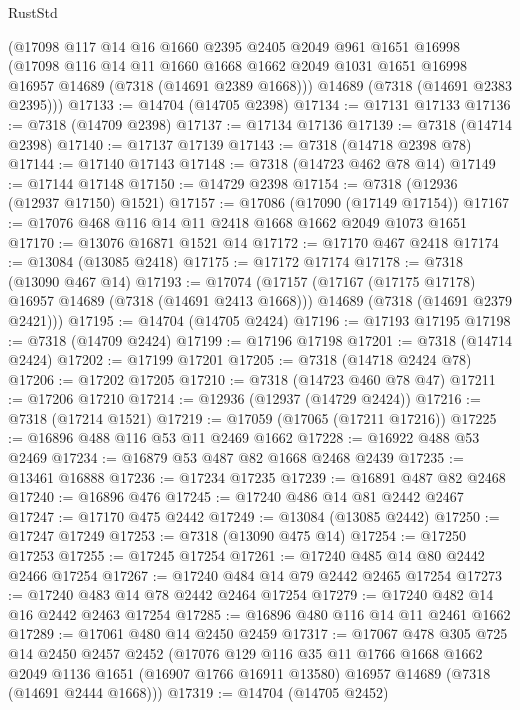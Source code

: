 \begin{lexlean}{RustStd}
\begin{coremodule}
    (@17098
      @117
      @14
      @16
      @1660
      @2395
      @2405
      @2049
      @961
      @1651
      @16998
      (@17098
        @116
        @14
        @11
        @1660
        @1668
        @1662
        @2049
        @1031
        @1651
        @16998
        @16957
        @14689
        (@7318 (@14691 @2389 @1668)))
      @14689
      (@7318 (@14691 @2383 @2395)))
@17133 := @14704 (@14705 @2398)
@17134 := @17131 @17133
@17136 := @7318 (@14709 @2398)
@17137 := @17134 @17136
@17139 := @7318 (@14714 @2398)
@17140 := @17137 @17139
@17143 := @7318 (@14718 @2398 @78)
@17144 := @17140 @17143
@17148 := @7318 (@14723 @462 @78 @14)
@17149 := @17144 @17148
@17150 := @14729 @2398
@17154 := @7318 (@12936 (@12937 @17150) @1521)
@17157 := @17086 (@17090 (@17149 @17154))
@17167 := @17076 @468 @116 @14 @11 @2418 @1668 @1662 @2049 @1073 @1651
@17170 := @13076 @16871 @1521 @14
@17172 := @17170 @467 @2418
@17174 := @13084 (@13085 @2418)
@17175 := @17172 @17174
@17178 := @7318 (@13090 @467 @14)
@17193 := @17074
    (@17157
      (@17167 (@17175 @17178) @16957 @14689 (@7318 (@14691 @2413 @1668)))
      @14689
      (@7318 (@14691 @2379 @2421)))
@17195 := @14704 (@14705 @2424)
@17196 := @17193 @17195
@17198 := @7318 (@14709 @2424)
@17199 := @17196 @17198
@17201 := @7318 (@14714 @2424)
@17202 := @17199 @17201
@17205 := @7318 (@14718 @2424 @78)
@17206 := @17202 @17205
@17210 := @7318 (@14723 @460 @78 @47)
@17211 := @17206 @17210
@17214 := @12936 (@12937 (@14729 @2424))
@17216 := @7318 (@17214 @1521)
@17219 := @17059 (@17065 (@17211 @17216))
@17225 := @16896 @488 @116 @53 @11 @2469 @1662
@17228 := @16922 @488 @53 @2469
@17234 := @16879 @53 @487 @82 @1668 @2468 @2439
@17235 := @13461 @16888
@17236 := @17234 @17235
@17239 := @16891 @487 @82 @2468
@17240 := @16896 @476
@17245 := @17240 @486 @14 @81 @2442 @2467
@17247 := @17170 @475 @2442
@17249 := @13084 (@13085 @2442)
@17250 := @17247 @17249
@17253 := @7318 (@13090 @475 @14)
@17254 := @17250 @17253
@17255 := @17245 @17254
@17261 := @17240 @485 @14 @80 @2442 @2466 @17254
@17267 := @17240 @484 @14 @79 @2442 @2465 @17254
@17273 := @17240 @483 @14 @78 @2442 @2464 @17254
@17279 := @17240 @482 @14 @16 @2442 @2463 @17254
@17285 := @16896 @480 @116 @14 @11 @2461 @1662
@17289 := @17061 @480 @14 @2450 @2459
@17317 := @17067
    @478
    @305
    @725
    @14
    @2450
    @2457
    @2452
    (@17076
      @129
      @116
      @35
      @11
      @1766
      @1668
      @1662
      @2049
      @1136
      @1651
      (@16907 @1766 @16911 @13580)
      @16957
      @14689
      (@7318 (@14691 @2444 @1668)))
@17319 := @14704 (@14705 @2452)

\end{coremodule}
\end{lexlean}

